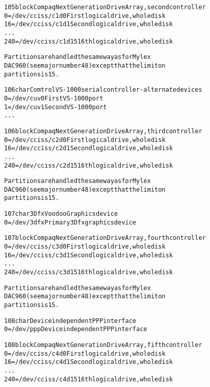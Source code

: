 \documentclass[a4paper,8pt,english]{sphinxmanual}
\begin{document}
\begin{alltt}
 105 block      Compaq Next Generation Drive Array, second controller
                  0 = /dev/cciss/c1d0   First logical drive, whole disk
                 16 = /dev/cciss/c1d1   Second logical drive, whole disk
                    ...
                240 = /dev/cciss/c1d15  16th logical drive, whole disk

                Partitions are handled the same way as for Mylex
                DAC960 (see major number 48) except that the limit on
                partitions is 15.

 106 char       Comtrol VS-1000 serial controller - alternate devices
                  0 = /dev/cuv0         First VS-1000 port
                  1 = /dev/cuv1         Second VS-1000 port
                    ...

 106 block      Compaq Next Generation Drive Array, third controller
                  0 = /dev/cciss/c2d0   First logical drive, whole disk
                 16 = /dev/cciss/c2d1   Second logical drive, whole disk
                    ...
                240 = /dev/cciss/c2d15  16th logical drive, whole disk

                Partitions are handled the same way as for Mylex
                DAC960 (see major number 48) except that the limit on
                partitions is 15.

 107 char       3Dfx Voodoo Graphics device
                  0 = /dev/3dfx         Primary 3Dfx graphics device

 107 block      Compaq Next Generation Drive Array, fourth controller
                  0 = /dev/cciss/c3d0   First logical drive, whole disk
                 16 = /dev/cciss/c3d1   Second logical drive, whole disk
                    ...
                240 = /dev/cciss/c3d15  16th logical drive, whole disk

                Partitions are handled the same way as for Mylex
                DAC960 (see major number 48) except that the limit on
                partitions is 15.

 108 char       Device independent PPP interface
                  0 = /dev/ppp          Device independent PPP interface

 108 block      Compaq Next Generation Drive Array, fifth controller
                  0 = /dev/cciss/c4d0   First logical drive, whole disk
                 16 = /dev/cciss/c4d1   Second logical drive, whole disk
                    ...
                240 = /dev/cciss/c4d15  16th logical drive, whole disk


\end{alltt}
\end{document}
